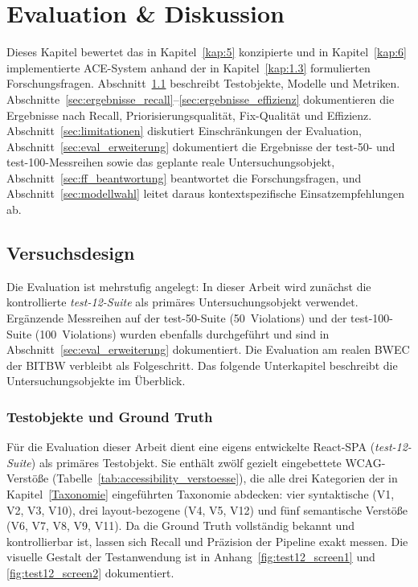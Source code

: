 \chapter{Evaluation \& Diskussion} \label{kap:7}

Dieses Kapitel bewertet das in Kapitel~\ref{kap:5} konzipierte und in Kapitel~\ref{kap:6} implementierte \ac{ACE}-System anhand der in Kapitel~\ref{kap:1.3} formulierten Forschungsfragen. Abschnitt~\ref{sec:versuchsdesign} beschreibt Testobjekte, Modelle und Metriken. Abschnitte~\ref{sec:ergebnisse_recall}--\ref{sec:ergebnisse_effizienz} dokumentieren die Ergebnisse nach Recall, Priorisierungsqualität, Fix-Qualität und Effizienz. Abschnitt~\ref{sec:limitationen} diskutiert Einschränkungen der Evaluation, Abschnitt~\ref{sec:eval_erweiterung} dokumentiert die Ergebnisse der test-50- und test-100-Messreihen sowie das geplante reale Untersuchungsobjekt, Abschnitt~\ref{sec:ff_beantwortung} beantwortet die Forschungsfragen, und Abschnitt~\ref{sec:modellwahl} leitet daraus kontextspezifische Einsatzempfehlungen ab.

\section{Versuchsdesign}
\label{sec:versuchsdesign}

Die Evaluation ist mehrstufig angelegt: In dieser Arbeit wird zunächst die kontrollierte \textit{test-12-Suite} als primäres Untersuchungsobjekt verwendet. Ergänzende Messreihen auf der test-50-Suite (50~Violations) und der test-100-Suite (100~Violations) wurden ebenfalls durchgeführt und sind in Abschnitt~\ref{sec:eval_erweiterung} dokumentiert. Die Evaluation am realen \acf{BWEC} der \ac{BITBW} verbleibt als Folgeschritt. Das folgende Unterkapitel beschreibt die Untersuchungsobjekte im Überblick.

\subsection{Testobjekte und Ground Truth}
\label{sec:versuch_testobjekt}

Für die Evaluation dieser Arbeit dient eine eigens entwickelte React-\ac{SPA} (\textit{test-12-Suite}) als primäres Testobjekt. Sie enthält zwölf gezielt eingebettete \ac{WCAG}-Verstöße (Tabelle~\ref{tab:accessibility_verstoesse}), die alle drei Kategorien der in Kapitel~\ref{Taxonomie} eingeführten Taxonomie abdecken: vier syntaktische (V1, V2, V3, V10), drei layout-bezogene (V4, V5, V12) und fünf semantische Verstöße (V6, V7, V8, V9, V11). Da die Ground Truth vollständig bekannt und kontrollierbar ist, lassen sich Recall und Präzision der Pipeline exakt messen. Die visuelle Gestalt der Testanwendung ist in Anhang~\ref{fig:test12_screen1} und \ref{fig:test12_screen2} dokumentiert.

